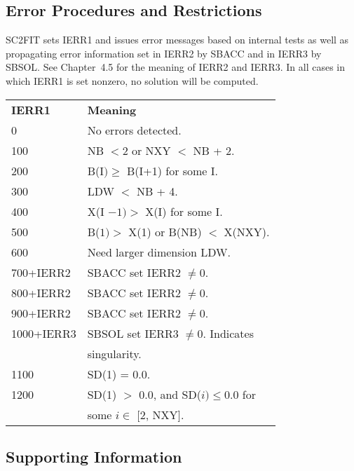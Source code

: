 \documentclass[twoside]{MATH77}
\begin{document}



\subsection{Error Procedures and Restrictions}

SC2FIT sets IERR1 and issues error messages based on internal tests as well
as propagating error information set in IERR2 by SBACC and in IERR3 by
SBSOL. See Chapter~4.5 for the meaning of IERR2 and IERR3. In all cases in
which IERR1 is set nonzero, no solution will be computed.

\begin{tabular}{ll}
{\bf IERR1} & {\bf \quad \quad Meaning}\\

\phantom{100}0 & No errors detected.\\

\phantom{1}100 & NB $< 2$ or NXY $<$ NB + 2.\\

\phantom{1}200 & B(I$) \geq $ B(I+1) for some I.\\

\phantom{1}300 & LDW $<$ NB + 4.\\

\phantom{1}400 & X(I $- 1) > $ X(I) for some I.\\

\phantom{1}500 & B($1) > $ X(1) or B(NB) $<$ X(NXY).\\

\phantom{1}600 & Need larger dimension LDW.\\

\phantom{1}700+IERR2 & SBACC set IERR2 $\neq 0$.\\

\phantom{1}800+IERR2 & SBACC set IERR2 $\neq 0$.\\

\phantom{1}900+IERR2 & SBACC set IERR2 $\neq 0$.\\

 1000+IERR3 & SBSOL set IERR3 $\neq 0$. Indicates\\
 & singularity.\\

 1100 & SD(1) = 0.0.\\

 1200 & SD(1) $>$ 0.0, and SD($i) \leq 0.0$ for\\
 & some $i \in $ {[2, NXY]}.
\end{tabular}
\subsection{Supporting Information}
\end{document}
